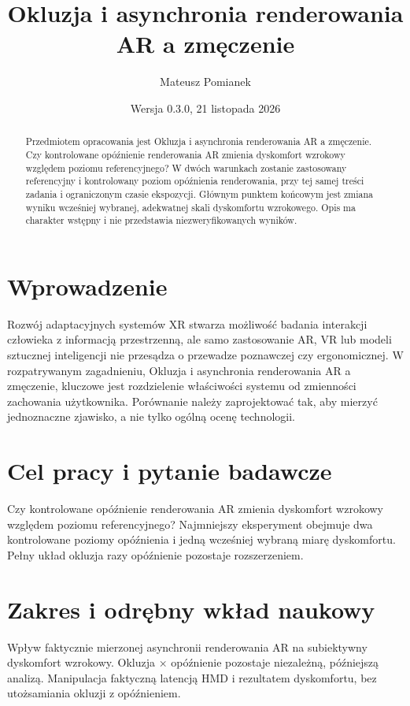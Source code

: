 \documentclass[11pt,a4paper]{article}
\title{Okluzja i asynchronia renderowania AR a zmęczenie}
\author{Mateusz Pomianek}
\date{Wersja 0.3.0, 21 listopada 2026}
\begin{document}
\maketitle

\begin{abstract}

Przedmiotem opracowania jest Okluzja i asynchronia renderowania AR a zmęczenie. Czy kontrolowane opóźnienie renderowania AR zmienia dyskomfort wzrokowy względem poziomu referencyjnego? W dwóch warunkach zostanie zastosowany referencyjny i kontrolowany poziom opóźnienia renderowania, przy tej samej treści zadania i ograniczonym czasie ekspozycji. Głównym punktem końcowym jest zmiana wyniku wcześniej wybranej, adekwatnej skali dyskomfortu wzrokowego. Opis ma charakter wstępny i nie przedstawia niezweryfikowanych wyników.

\end{abstract}

\section{Wprowadzenie}

Rozwój adaptacyjnych systemów XR stwarza możliwość badania interakcji człowieka z informacją przestrzenną, ale samo zastosowanie AR, VR lub modeli sztucznej inteligencji nie przesądza o przewadze poznawczej czy ergonomicznej. W rozpatrywanym zagadnieniu, Okluzja i asynchronia renderowania AR a zmęczenie, kluczowe jest rozdzielenie właściwości systemu od zmienności zachowania użytkownika. Porównanie należy zaprojektować tak, aby mierzyć jednoznaczne zjawisko, a nie tylko ogólną ocenę technologii.

\section{Cel pracy i pytanie badawcze}

Czy kontrolowane opóźnienie renderowania AR zmienia dyskomfort wzrokowy względem poziomu referencyjnego? Najmniejszy eksperyment obejmuje dwa kontrolowane poziomy opóźnienia i jedną wcześniej wybraną miarę dyskomfortu. Pełny układ okluzja razy opóźnienie pozostaje rozszerzeniem.

\section{Zakres i odrębny wkład naukowy}
Wpływ faktycznie mierzonej asynchronii renderowania AR na subiektywny dyskomfort wzrokowy. Okluzja × opóźnienie pozostaje niezależną, późniejszą analizą. Manipulacja faktyczną latencją HMD i rezultatem dyskomfortu, bez utożsamiania okluzji z opóźnieniem.
\end{document}
